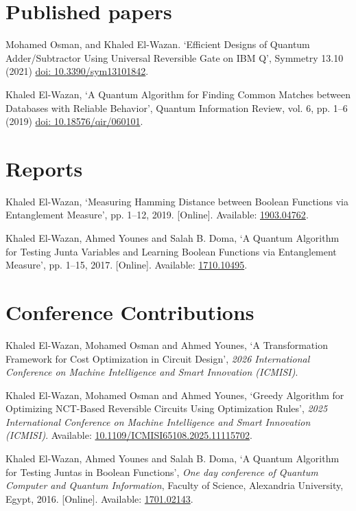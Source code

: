 \documentclass[margin,line]{resume}
\newcommand*{\doi}[1]{\href{http://dx.doi.org/#1}{doi: #1}}
\begin{document}
\begin{resume}
	\section{Published papers\mysidestyle}

	Mohamed Osman, and Khaled El-Wazan. `Efficient Designs of Quantum Adder/Subtractor Using Universal Reversible Gate on IBM Q', Symmetry 13.10 (2021) \doi{10.3390/sym13101842}.


	Khaled El-Wazan, `A Quantum Algorithm for Finding Common Matches between Databases with Reliable Behavior', Quantum Information Review, vol. 6, pp. 1--6 (2019) \doi{10.18576/qir/060101}.


	\section{Reports\mysidestyle}

	Khaled El-Wazan, `Measuring Hamming Distance between Boolean Functions via Entanglement Measure',  pp. 1--12, 2019.
		[Online]. Available: \href{http://arxiv.org/abs/1903.04762}{1903.04762}.



	Khaled El-Wazan, Ahmed Younes and Salah B. Doma, `A Quantum Algorithm for Testing Junta Variables and Learning Boolean Functions via Entanglement Measure',  pp. 1--15, 2017. [Online]. Available: \href{http://arxiv.org/abs/1710.10495}{1710.10495}.



	\section{Conference Contributions\mysidestyle}

	Khaled El-Wazan, Mohamed Osman and Ahmed Younes, `A Transformation Framework for Cost Optimization in Circuit Design', \textit{2026 International Conference on Machine Intelligence and Smart Innovation (ICMISI)}.

	Khaled El-Wazan, Mohamed Osman and Ahmed Younes, `Greedy Algorithm for Optimizing NCT-Based Reversible Circuits Using Optimization Rules', \textit{2025 International Conference on Machine Intelligence and Smart Innovation (ICMISI)}. Available: \href{https://ieeexplore.ieee.org/document/11115702}{10.1109/ICMISI65108.2025.11115702}.

	Khaled El-Wazan, Ahmed Younes and Salah B. Doma, `A Quantum Algorithm for Testing Juntas in Boolean Functions', \textit{One day conference of Quantum Computer and Quantum Information}, Faculty of Science, Alexandria University, Egypt, 2016. [Online]. Available: \href{http://arxiv.org/abs/1701.02143}{1701.02143}.



\end{resume}
\end{document}
